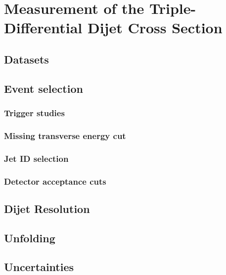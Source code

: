 \chapter{Measurement of the Triple-Differential Dijet Cross Section}

\section{Datasets}

\section{Event selection}

\subsection{Trigger studies}
\subsection{Missing transverse energy cut}
\subsection{Jet ID selection}
\subsection{Detector acceptance cuts}

\section{Dijet Resolution}

\section{Unfolding}

\section{Uncertainties}
